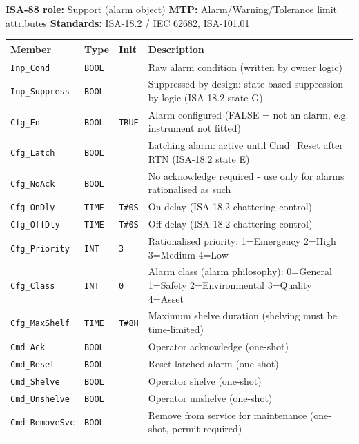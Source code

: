 {\small\textbf{ISA-88 role:} Support (alarm object) \quad \textbf{MTP:} Alarm/\allowbreak{}Warning/\allowbreak{}Tolerance limit attributes \quad \textbf{Standards:} ISA-18.2 /\allowbreak{} IEC 62682, ISA-101.01}
{\footnotesize
\begin{longtable}{@{}>{\raggedright\arraybackslash}p{3.4cm}>{\raggedright\arraybackslash}p{3.3cm}>{\raggedright\arraybackslash}p{1.3cm}>{\raggedright\arraybackslash}p{6.4cm}@{}}
\toprule
\rowcolor{tblhead}\textbf{Member} & \textbf{Type} & \textbf{Init} & \textbf{Description} \\
\midrule
\endhead
\texttt{Inp\_Cond} & \texttt{BOOL} &  & Raw alarm condition (written by owner logic) \\
\texttt{Inp\_Suppress} & \texttt{BOOL} &  & Suppressed-by-design: state-based suppression by logic (ISA-18.2 state G) \\
\texttt{Cfg\_En} & \texttt{BOOL} & \texttt{TRUE} & Alarm configured (FALSE = not an alarm, e.g. instrument not fitted) \\
\texttt{Cfg\_Latch} & \texttt{BOOL} &  & Latching alarm: active until Cmd\_Reset after RTN (ISA-18.2 state E) \\
\texttt{Cfg\_NoAck} & \texttt{BOOL} &  & No acknowledge required - use only for alarms rationalised as such \\
\texttt{Cfg\_OnDly} & \texttt{TIME} & \texttt{T\#0S} & On-delay (ISA-18.2 chattering control) \\
\texttt{Cfg\_OffDly} & \texttt{TIME} & \texttt{T\#0S} & Off-delay (ISA-18.2 chattering control) \\
\texttt{Cfg\_Priority} & \texttt{INT} & \texttt{3} & Rationalised priority: 1=Emergency 2=High 3=Medium 4=Low \\
\texttt{Cfg\_Class} & \texttt{INT} & \texttt{0} & Alarm class (alarm philosophy): 0=General 1=Safety 2=Environmental 3=Quality 4=Asset \\
\texttt{Cfg\_MaxShelf} & \texttt{TIME} & \texttt{T\#8H} & Maximum shelve duration (shelving must be time-limited) \\
\texttt{Cmd\_Ack} & \texttt{BOOL} &  & Operator acknowledge (one-shot) \\
\texttt{Cmd\_Reset} & \texttt{BOOL} &  & Reset latched alarm (one-shot) \\
\texttt{Cmd\_Shelve} & \texttt{BOOL} &  & Operator shelve (one-shot) \\
\texttt{Cmd\_Unshelve} & \texttt{BOOL} &  & Operator unshelve (one-shot) \\
\texttt{Cmd\_RemoveSvc} & \texttt{BOOL} &  & Remove from service for maintenance (one-shot, permit required) \\

\end{longtable}}

